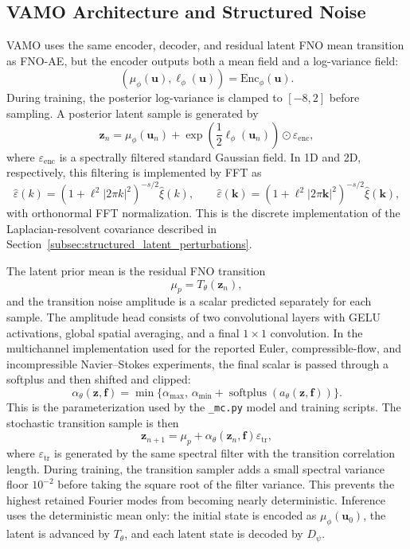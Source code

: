 \documentclass[11pt]{article}
\begin{document}
\subsection{VAMO Architecture and Structured Noise}
VAMO uses the same encoder, decoder, and residual latent FNO mean transition as
FNO-AE, but the encoder outputs both a mean field and a log-variance field:
\[
    (\mu_\phi(\mathbf u),\ell_\phi(\mathbf u))
    =
    \mathrm{Enc}_\phi(\mathbf u).
\]
During training, the posterior log-variance is clamped to $[-8,2]$ before
sampling. A posterior latent sample is generated by
\[
    \mathbf z_n
    =
    \mu_\phi(\mathbf u_n)
    +
    \exp\!\left(\frac12\ell_\phi(\mathbf u_n)\right)
    \odot \varepsilon_{\mathrm{enc}},
\]
where $\varepsilon_{\mathrm{enc}}$ is a spectrally filtered standard Gaussian
field. In 1D and 2D, respectively, this filtering is implemented by FFT as
\[
    \widehat{\varepsilon}(k)
    =
    \left(1+\ell^2 |2\pi k|^2\right)^{-s/2}\widehat{\xi}(k),
    \qquad
    \widehat{\varepsilon}(\mathbf k)
    =
    \left(1+\ell^2 |2\pi\mathbf k|^2\right)^{-s/2}
    \widehat{\xi}(\mathbf k),
\]
with orthonormal FFT normalization. This is the discrete implementation of the
Laplacian-resolvent covariance described in
Section~\ref{subsec:structured_latent_perturbations}.

The latent prior mean is the residual FNO transition
\[
    \mu_p=T_\theta(\mathbf z_n),
\]
and the transition noise amplitude is a scalar predicted separately for each
sample. The amplitude head consists of two convolutional layers with GELU
activations, global spatial averaging, and a final $1\times1$ convolution. In
the multichannel implementation used for the reported Euler, compressible-flow,
and incompressible Navier--Stokes experiments, the final scalar is passed
through a softplus and then shifted and clipped:
\[
    \alpha_\theta(\mathbf z,\mathbf f)
    =
    \min\{\alpha_{\max},\, \alpha_{\min}
    +\operatorname{softplus}(a_\theta(\mathbf z,\mathbf f))\}.
\]
This is the parameterization used by the \texttt{\_mc.py} model and training
scripts. The stochastic transition sample is then
\[
    \mathbf z_{n+1}
    =
    \mu_p
    +
    \alpha_\theta(\mathbf z_n,\mathbf f)\varepsilon_{\mathrm{tr}},
\]
where $\varepsilon_{\mathrm{tr}}$ is generated by the same spectral filter with
the transition correlation length. During training, the transition sampler adds
a small spectral variance floor $10^{-2}$ before taking the square root of the
filter variance. This prevents the highest retained Fourier modes from becoming
nearly deterministic. Inference uses the deterministic mean only: the initial
state is encoded as $\mu_\phi(\mathbf u_0)$, the latent is advanced by
$T_\theta$, and each latent state is decoded by $D_\psi$.
\end{document}
